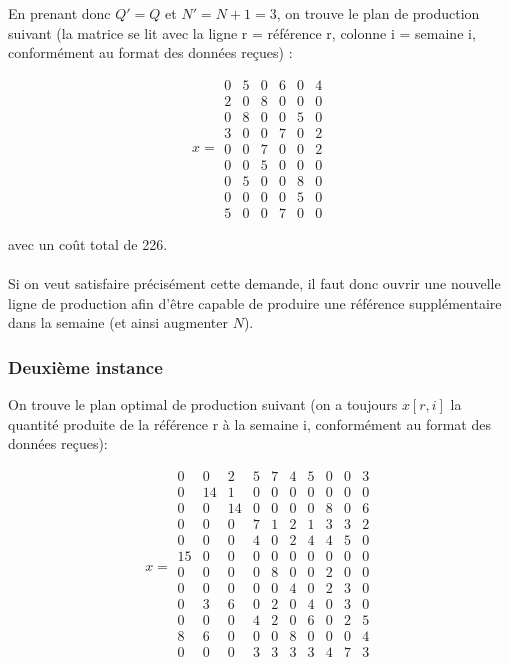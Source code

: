 \documentclass{rapport}
\begin{document}
En prenant donc $Q'=Q$ et $N'=N+1=3$, on trouve le plan de production suivant (la matrice se lit avec la ligne r = référence r, colonne i = semaine i, conformément au format des données reçues) :

\[x=
\begin{matrix}
0 & 5 & 0 & 6 & 0 & 4 \\
2 & 0 & 8 & 0 & 0 & 0 \\
0 & 8 & 0 & 0 & 5 & 0 \\
3 & 0 & 0 & 7 & 0 & 2 \\
0 & 0 & 7 & 0 & 0 & 2 \\
0 & 0 & 5 & 0 & 0 & 0 \\
0 & 5 & 0 & 0 & 8 & 0 \\
0 & 0 & 0 & 0 & 5 & 0 \\
5 & 0 & 0 & 7 & 0 & 0
\end{matrix}
\]

avec un coût total de 226. \\
\ \\
Si on veut satisfaire précisément cette demande, il faut donc ouvrir une nouvelle ligne de production afin d'être capable de produire une référence supplémentaire dans la semaine (et ainsi augmenter $N$).

\subsubsection{Deuxième instance}
On trouve le plan optimal de production suivant (on a toujours $x[r,i]$ la quantité produite de la référence r à la semaine i, conformément au format des données reçues):

\[x=
\begin{matrix}
0 & 0 & 2 & 5 & 7 & 4 & 5 & 0 & 0 & 3 \\
0 & 14 & 1 & 0 & 0 & 0 & 0 & 0 & 0 & 0 \\
0 & 0 & 14 & 0 & 0 & 0 & 0 & 8 & 0 & 6 \\
0 & 0 & 0 & 7 & 1 & 2 & 1 & 3 & 3 & 2 \\
0 & 0 & 0 & 4 & 0 & 2 & 4 & 4 & 5 & 0 \\
15 & 0 & 0 & 0 & 0 & 0 & 0 & 0 & 0 & 0 \\
0 & 0 & 0 & 0 & 8 & 0 & 0 & 2 & 0 & 0 \\
0 & 0 & 0 & 0 & 0 & 4 & 0 & 2 & 3 & 0 \\
0 & 3 & 6 & 0 & 2 & 0 & 4 & 0 & 3 & 0 \\
0 & 0 & 0 & 4 & 2 & 0 & 6 & 0 & 2 & 5 \\
8 & 6 & 0 & 0 & 0 & 8 & 0 & 0 & 0 & 4 \\
0 & 0 & 0 & 3 & 3 & 3 & 3 & 4 & 7 & 3 \\
\end{matrix}
\]
\end{document}
